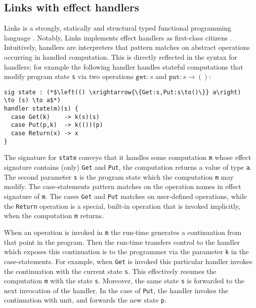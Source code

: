 \documentclass[preprint,10pt,numbers]{sigplanconf}
\begin{document}


  \subsection{Links with effect handlers}\label{sec:effect-links}
  Links is a strongly, statically and structural typed functional programming language \cite{Cooper2006}. Notably, Links implements effect handlers as first-class citizens \cite{Hillerstrom2015}. Intuitively, handlers are interpreters that pattern matches on abstract operations occurring in handled computation. This is directly reflected in the syntax for handlers; for example the following handler handles stateful computations that modify program state \texttt{s} via two operations $\texttt{get} : s$ and $\texttt{put} : s \to ()$:
\begin{lstlisting}[style=links,caption={}]
sig state : (*$\left(() \xrightarrow{\{Get:s,Put:s\to()\}} a\right) \to (s) \to a$*)
handler state(m)(s) {
  case Get(k)    -> k(s)(s)
  case Put(p,k)  -> k(())(p)
  case Return(x) -> x
}
\end{lstlisting}
The signature for \texttt{state} conveys that it handles some computation \texttt{m} whose effect signature contains (only) \texttt{Get} and \texttt{Put}, the computation returns a value of type \texttt{a}. The second parameter \texttt{s} is the program state which the computation \texttt{m} may modify.
The case-statements pattern matches on the operation names in effect signature of \texttt{m}.
The cases \texttt{Get} and \texttt{Put} matches on user-defined operations, while the \texttt{Return} operation is a special, built-in operation that is invoked implicitly, when the computation \texttt{m} returns.

When an operation is invoked in \texttt{m} the run-time generates a continuation from that point in the program. Then the run-time transfers control to the handler which exposes this continuation is to the programmer via the parameter \texttt{k} in the case-statements. For example, when \texttt{Get} is invoked this particular handler invokes the continuation with the current state \texttt{s}. This effectively resumes the computation \texttt{m} with the state \texttt{s}. Moreover, the same state \texttt{s} is forwarded to the next invocation of the handler. In the case of \texttt{Put}, the handler invokes the continuation with unit, and forwards the new state \texttt{p}.
\end{document}
